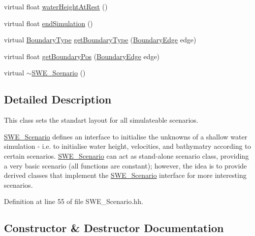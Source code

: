 \begin{DoxyCompactItemize}
\item 
virtual float \hyperlink{classSWE__Scenario_a9de0f0f9fcc34dfe00c522b10c343d91}{water\+Height\+At\+Rest} ()
\item 
virtual float \hyperlink{classSWE__Scenario_ae7ed72f584069e9885c33c4ca83f3ff5}{end\+Simulation} ()
\item 
virtual \hyperlink{scenarios_2SWE__Scenario_8hh_af75d5dd7322fa39ed0af4e7839e600f8}{Boundary\+Type} \hyperlink{classSWE__Scenario_ab8fe7ce15d7758fb0c4e0e3887b34a5d}{get\+Boundary\+Type} (\hyperlink{scenarios_2SWE__Scenario_8hh_aa5e01e3f7df312f7b9b0d02521141fcc}{Boundary\+Edge} edge)
\item 
virtual float \hyperlink{classSWE__Scenario_a1b01e953c2079b64f527c9bc5a0c86d7}{get\+Boundary\+Pos} (\hyperlink{scenarios_2SWE__Scenario_8hh_aa5e01e3f7df312f7b9b0d02521141fcc}{Boundary\+Edge} edge)
\item 
virtual \hyperlink{classSWE__Scenario_a5e20e1061abfa36d814e0650a12a2e69}{$\sim$\+S\+W\+E\+\_\+\+Scenario} ()
\end{DoxyCompactItemize}


\subsection{Detailed Description}
This class sets the standart layout for all simulateable scenarios. 

\hyperlink{classSWE__Scenario}{S\+W\+E\+\_\+\+Scenario} defines an interface to initialise the unknowns of a shallow water simulation -\/ i.\+e. to initialise water height, velocities, and bathymatry according to certain scenarios. \hyperlink{classSWE__Scenario}{S\+W\+E\+\_\+\+Scenario} can act as stand-\/alone scenario class, providing a very basic scenario (all functions are constant); however, the idea is to provide derived classes that implement the \hyperlink{classSWE__Scenario}{S\+W\+E\+\_\+\+Scenario} interface for more interesting scenarios. 

Definition at line 55 of file S\+W\+E\+\_\+\+Scenario.\+hh.



\subsection{Constructor \& Destructor Documentation}
